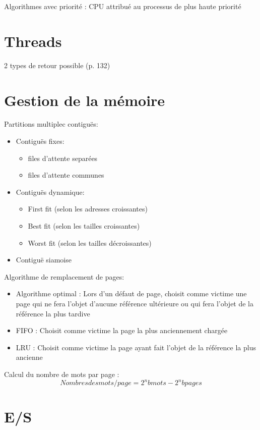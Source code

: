 \documentclass[11pt,a4paper,oneside,french,svgnames]{report}
\begin{document}
Algorithmes avec priorité :  CPU attribué au processus de plus haute priorité


\section*{Threads}

2 types de retour possible (p. 132)

\section*{Gestion de la mémoire}
Partitions  multiplec contiguës:
\begin{itemize}
\item Contiguës fixes:
\begin{itemize}
\item files d'attente separées
\item files d'attente communes
\end{itemize}
\item Contiguës dynamique:
\begin{itemize}
\item First fit (selon les adresses croissantes)
\item Best fit (selon les tailles croissantes)
\item Worst fit (selon les tailles décroissantes)
\end{itemize}
\item Contiguë siamoise
\end{itemize}

Algorithme de remplacement de pages:
\begin{itemize}
\item Algorithme optimal : Lors d'un défaut de page, choisit comme victime une page qui ne fera l'objet d'aucune référence ultérieure  ou qui fera l'objet de la référence la plus tardive
\item FIFO : Choisit comme victime la page la plus anciennement chargée
\item LRU  : Choisit comme victime la page ayant fait l'objet de la référence la plus ancienne
\end{itemize}

Calcul du nombre de mots par page :
\begin{equation}

Nombres des mots / page = 2^nbmots - 2^nbpages 

\end{equation}


\section*{E/S}
\end{document}
